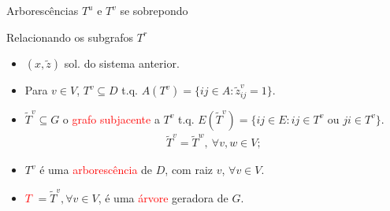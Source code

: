 \documentclass[dvipsnames]{beamer}
\newtheorem{fato}{Fato}
\begin{document}
\begin{frame}{Arborescências $T^u$ e $T^v$ se sobrepondo}
\begin{figure}[t]
{
}
  \label{fig:arb_iguais}
\end{figure}
  
\end{frame}

\begin{frame}{Relacionando os subgrafos $T^{r}$ \hyperlink{arb_diferentes}{}}
  \hypertarget{rel_subgrafos}{}
  \begin{itemize}
  \item $(x,\tilde{z})$ sol. do sistema anterior.
  \item Para $v \in V$, $T^{v} \subseteq D$ t.q. $A(T^{v}) = \{ ij \in A: \tilde{z}_{ij}^{v} = 1 \}$.
  \item 
    $\widetilde{T}^{v} \subseteq G$ o \textcolor{red}{grafo subjacente}
    a $T^{v}$ t.q. \mbox{$E(\widetilde{T}^{v}) = \{ij \in E: ij \in T^{v} \text{ ou }ji \in T^{v}\}$}.\\


\begin{align*}
  \widetilde{T}^{v} = \widetilde{T}^{w}, \: \forall v, w \in V;
\end{align*}

\item $T^{v}$ é uma \textcolor{red}{arborescência} de $D$, com raiz $v$, $\forall v \in V$.
  \item \textcolor{red}{$T$} $ = \widetilde{T}^{v}, \forall v \in V$, é uma \textcolor{red}{árvore} geradora de $G$.
    

  \end{itemize}
  
\end{frame}
\end{document}
